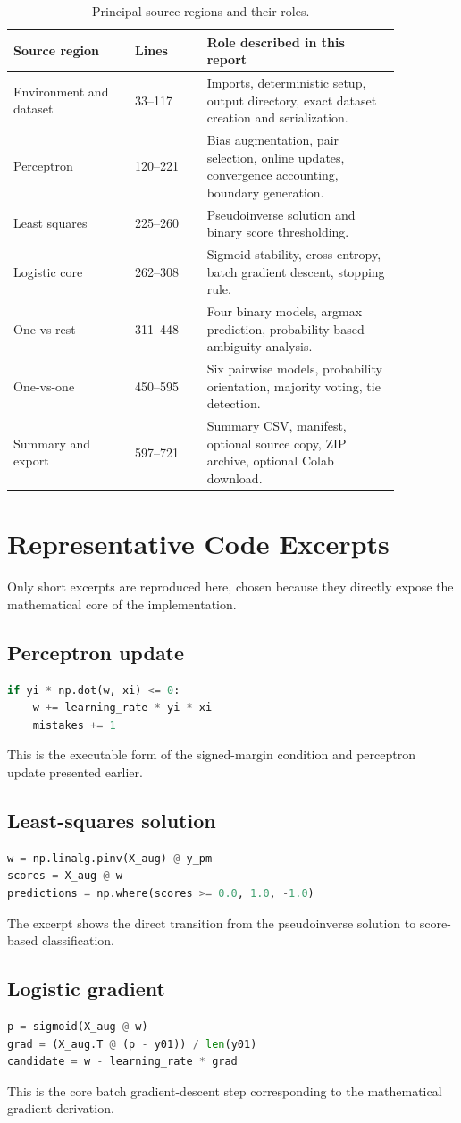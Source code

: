 \documentclass[11pt,a4paper]{article}
\begin{document}
\begin{table}[ht]
\centering
\caption{Principal source regions and their roles.}
\begin{tabular}{p{0.27\linewidth}p{0.16\linewidth}p{0.43\linewidth}}
\toprule
\textbf{Source region} & \textbf{Lines} & \textbf{Role described in this report}\\
\midrule
Environment and dataset & 33--117 & Imports, deterministic setup, output directory, exact dataset creation and serialization.\\
Perceptron & 120--221 & Bias augmentation, pair selection, online updates, convergence accounting, boundary generation.\\
Least squares & 225--260 & Pseudoinverse solution and binary score thresholding.\\
Logistic core & 262--308 & Sigmoid stability, cross-entropy, batch gradient descent, stopping rule.\\
One-vs-rest & 311--448 & Four binary models, argmax prediction, probability-based ambiguity analysis.\\
One-vs-one & 450--595 & Six pairwise models, probability orientation, majority voting, tie detection.\\
Summary and export & 597--721 & Summary CSV, manifest, optional source copy, ZIP archive, optional Colab download.\\
\bottomrule
\end{tabular}
\end{table}

\section{Representative Code Excerpts}
Only short excerpts are reproduced here, chosen because they directly expose the mathematical core of the implementation.

\subsection{Perceptron update}
\begin{lstlisting}[language=Python]
if yi * np.dot(w, xi) <= 0:
    w += learning_rate * yi * xi
    mistakes += 1
\end{lstlisting}
This is the executable form of the signed-margin condition and perceptron update presented earlier.

\subsection{Least-squares solution}
\begin{lstlisting}[language=Python]
w = np.linalg.pinv(X_aug) @ y_pm
scores = X_aug @ w
predictions = np.where(scores >= 0.0, 1.0, -1.0)
\end{lstlisting}
The excerpt shows the direct transition from the pseudoinverse solution to score-based classification.

\subsection{Logistic gradient}
\begin{lstlisting}[language=Python]
p = sigmoid(X_aug @ w)
grad = (X_aug.T @ (p - y01)) / len(y01)
candidate = w - learning_rate * grad
\end{lstlisting}
This is the core batch gradient-descent step corresponding to the mathematical gradient derivation.
\end{document}
